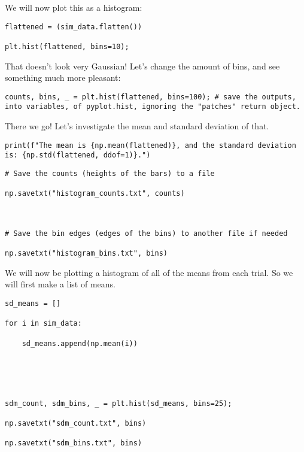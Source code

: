 \documentclass[12pt]{article}
\begin{document}
We will now plot this as a histogram:

\bigskip
 
\begin{lstlisting}[frame=shadowbox]
flattened = (sim_data.flatten())

plt.hist(flattened, bins=10);
\end{lstlisting}
\medskip

That doesn't look very Gaussian! Let's change the amount of bins, and see something much more pleasant:

\bigskip
 
\begin{lstlisting}[frame=shadowbox]
counts, bins, _ = plt.hist(flattened, bins=100); # save the outputs, into variables, of pyplot.hist, ignoring the "patches" return object.
\end{lstlisting}
\medskip

There we go! Let's investigate the mean and standard deviation of that.

\bigskip
 
\begin{lstlisting}[frame=shadowbox]
print(f"The mean is {np.mean(flattened)}, and the standard deviation is: {np.std(flattened, ddof=1)}.")
\end{lstlisting}
\medskip
\bigskip
 
\begin{lstlisting}[frame=shadowbox]
# Save the counts (heights of the bars) to a file

np.savetxt("histogram_counts.txt", counts)



# Save the bin edges (edges of the bins) to another file if needed

np.savetxt("histogram_bins.txt", bins)
\end{lstlisting}
\medskip

We will now be plotting a histogram of all of the means from each trial. So we will first make a list of means.

\bigskip
 
\begin{lstlisting}[frame=shadowbox]
sd_means = []

for i in sim_data:

    sd_means.append(np.mean(i))





sdm_count, sdm_bins, _ = plt.hist(sd_means, bins=25);

np.savetxt("sdm_count.txt", bins)

np.savetxt("sdm_bins.txt", bins)
\end{lstlisting}
\medskip
\end{document}
